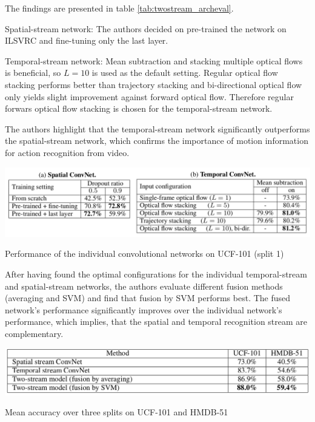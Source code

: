 The findings are presented in table \ref{tab:twostream_archeval}.

Spatial-stream network: The authors decided on pre-trained the network on ILSVRC and fine-tuning only the last layer.

Temporal-stream network: Mean subtraction and stacking multiple optical flows is beneficial, so $L=10$ is used as the default setting. Regular optical flow stacking performs better than trajectory stacking and bi-directional optical flow only yields slight improvement against forward optical flow. Therefore regular forwars optical flow stacking is chosen for the temporal-stream network.

The authors highlight that the temporal-stream network significantly outperforms the spatial-stream network, which confirms the importance of motion information for action recognition from video.

\begin{table}[H]
    \centering
    \includegraphics[width=\textwidth]{img_deep/twostream_archeval}
    \caption{Performance of the individual convolutional networks on UCF-101 (split 1) \cite{simonyan_two-stream_2014}}
    \label{tab:twostream_archeval}
\end{table}

After having found the optimal configurations for the individual temporal-stream and spatial-stream networks, the authors evaluate different fusion methods (averaging and SVM) and find that fusion by SVM performs best. The fused network's performance significantly improves over the individual network's performance, which implies, that the spatial and temporal recognition stream are complementary.

\begin{table}[H]
    \centering
    \includegraphics[width=\textwidth]{img_deep/twostream_results}
    \caption{Mean accuracy over three splits on UCF-101 and HMDB-51 \cite{simonyan_two-stream_2014}}
    \label{tab:twostream_results}
\end{table}

